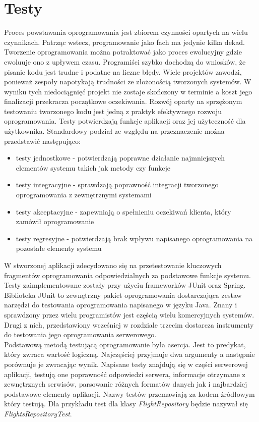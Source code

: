 \documentclass[12pt, twoside]{report}
\begin{document}
\chapter{Testy}
Proces powstawania oprogramowania jest zbiorem czynności opartych na wielu czynnikach. Patrząc wstecz, programowanie jako fach ma jedynie kilka dekad. Tworzenie oprogramowania można potraktować jako proces ewolucyjny gdzie ewoluuje ono z upływem czasu. Programiści szybko dochodzą do wniosków, że pisanie kodu jest trudne i podatne na liczne błędy. Wiele projektów zawodzi, ponieważ zespoły napotykają trudności ze złożonością tworzonych systemów. W wyniku tych niedociągnięć projekt nie zostaje skończony w terminie a koszt jego finalizacji przekracza początkowe oczekiwania\cite{testing}. Rozwój oparty na sprzężonym testowaniu tworzonego kodu jest jedną z praktyk efektywnego rozwoju oprogramowania. Testy potwierdzają funkcje aplikacji oraz jej użyteczność dla użytkownika. Standardowy podział ze względu na przeznaczenie można przedstawić następująco:
\begin{itemize}[noitemsep,topsep=0pt]
\item testy jednostkowe - potwierdzają poprawne działanie najmniejszych elementów systemu takich jak metody czy funkcje
\item testy integracyjne - sprawdzają poprawność integracji tworzonego oprogramowania z zewnętrznymi systemami
\item testy akceptacyjne - zapewniają o spełnieniu oczekiwań klienta, który zamówił oprogramowanie
\item testy regresyjne - potwierdzają brak wpływu napisanego oprogramowania na pozostałe elementy systemu
\end{itemize}
W stworzonej aplikacji zdecydowano się na przetestowanie kluczowych fragmentów oprogramowania odpowiedzialnych za podstawowe funkcje systemu. Testy zaimplementowane zostały przy użyciu frameworków JUnit oraz Spring. Biblioteka JUnit to zewnętrzny pakiet oprogramowania dostarczająca zestaw narzędzi do testowania oprogramowania napisanego w języku Java. Znany i sprawdzony przez wielu programistów jest częścią wielu komercyjnych systemów. Drugi z nich, przedstawiony wcześniej w rozdziale trzecim dostarcza instrumenty do testowania jego oprogramowania serwerowego. \\ \indent
Podstawową metodą testującą oprogramowanie była asercja. Jest to predykat, który zwraca wartość logiczną. Najczęściej przyjmuje dwa argumenty a następnie porównuje je zwracając wynik\cite{assertion}. Napisane testy znajdują się w części serwerowej aplikacji, testują one poprawność odpowiedzi serwera, informacje otrzymane z zewnętrznych serwisów, parsowanie różnych formatów danych jak i najbardziej podstawowe elementy aplikacji. Nazwy testów przemawiają za kodem źródłowym który testują. Dla przykładu test dla klasy \textit{FlightRepository} będzie nazywał się \textit{FlightsRepositoryTest}. \\
\end{document}
